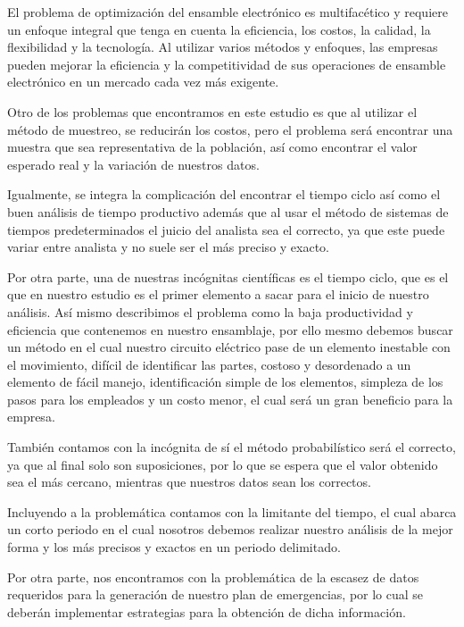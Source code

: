     El problema de optimización del ensamble electrónico es multifacético y requiere un enfoque integral que tenga en cuenta la eficiencia, los costos, la calidad, la flexibilidad y la tecnología. Al utilizar varios métodos y enfoques, las empresas pueden mejorar la eficiencia y la competitividad de sus operaciones de ensamble electrónico en un mercado cada vez más exigente.
    
    Otro de los problemas que encontramos en este estudio es que al utilizar el método de muestreo, se reducirán los costos, pero el problema será encontrar una muestra que sea representativa de la población, así como encontrar el valor esperado real y la variación de nuestros datos.
    
    Igualmente, se integra la complicación del encontrar el tiempo ciclo así como el buen análisis de tiempo productivo además que al usar el método de sistemas de tiempos predeterminados el juicio del analista sea el correcto, ya que este puede variar entre analista y no suele ser el más preciso y exacto.
    
    Por otra parte, una de nuestras incógnitas científicas es el tiempo ciclo, que es el que en nuestro estudio es el primer elemento a sacar para el inicio de nuestro análisis. Así mismo describimos el problema como la baja productividad y eficiencia que contenemos en nuestro ensamblaje, por ello mesmo debemos buscar un método en el cual nuestro circuito eléctrico pase de un elemento inestable con el movimiento, difícil de identificar las partes, costoso y desordenado a un elemento de fácil manejo, identificación simple de los elementos, simpleza de los pasos para los empleados y un costo menor, el cual será un gran beneficio para la empresa. 
    
    También contamos con la incógnita de sí el método probabilístico será el correcto, ya que al final solo son suposiciones, por lo que se espera que el valor obtenido sea el más cercano, mientras que nuestros datos sean los correctos.
    
    Incluyendo a la problemática contamos con la limitante del tiempo, el cual abarca un corto periodo en el cual nosotros debemos realizar nuestro análisis de la mejor forma y los más precisos y exactos en un periodo delimitado.
    
    Por otra parte, nos encontramos con la problemática de la escasez de datos requeridos para la generación de nuestro plan de emergencias, por lo cual se deberán implementar estrategias para la obtención de dicha información.
    
